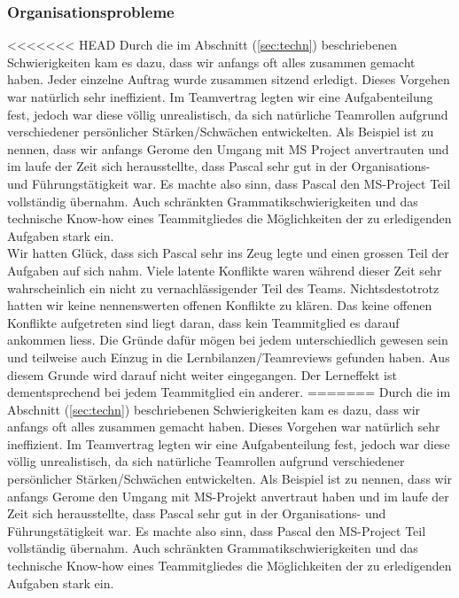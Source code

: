 \subsubsection {Organisationsprobleme} \label{sec:orgprob}
<<<<<<< HEAD
Durch die im Abschnitt (\ref{sec:techn}) beschriebenen Schwierigkeiten kam es dazu, dass wir anfangs oft alles zusammen gemacht haben. Jeder einzelne Auftrag wurde zusammen sitzend erledigt. Dieses Vorgehen war natürlich sehr ineffizient. Im Teamvertrag legten wir eine Aufgabenteilung fest, jedoch war diese völlig unrealistisch, da sich natürliche Teamrollen aufgrund verschiedener persönlicher Stärken/Schwächen entwickelten. Als Beispiel ist zu nennen, dass wir anfangs Gerome den Umgang mit MS Project anvertrauten und im laufe der Zeit sich herausstellte, dass Pascal sehr gut in der Organisations- und Führungstätigkeit war. Es machte also sinn, dass Pascal den MS-Project Teil vollständig übernahm. Auch schränkten Grammatikschwierigkeiten und das technische Know-how eines Teammitgliedes die Möglichkeiten der zu erledigenden Aufgaben stark ein. \\
Wir hatten Glück, dass sich Pascal sehr ins Zeug legte und einen grossen Teil der Aufgaben auf sich nahm. Viele latente Konflikte waren während dieser Zeit sehr wahrscheinlich ein nicht zu vernachlässigender Teil des Teams. Nichtsdestotrotz hatten wir keine nennenswerten offenen Konflikte zu klären. Das keine offenen Konflikte aufgetreten sind liegt daran, dass kein Teammitglied es darauf ankommen liess. Die Gründe dafür mögen bei jedem unterschiedlich gewesen sein und teilweise auch Einzug in die Lernbilanzen/Teamreviews gefunden haben. Aus diesem Grunde wird darauf nicht weiter eingegangen. Der Lerneffekt ist dementsprechend bei jedem Teammitglied ein anderer.
=======
Durch die im Abschnitt (\ref{sec:techn}) beschriebenen Schwierigkeiten kam es dazu, dass wir anfangs oft alles zusammen gemacht haben. Dieses Vorgehen war natürlich sehr ineffizient. Im Teamvertrag legten wir eine Aufgabenteilung fest, jedoch war diese völlig unrealistisch, da sich natürliche Teamrollen aufgrund verschiedener persönlicher Stärken/Schwächen entwickelten. Als Beispiel ist zu nennen, dass wir anfangs Gerome den Umgang mit MS-Projekt anvertraut haben und im laufe der Zeit sich herausstellte, dass Pascal sehr gut in der Organisations- und Führungstätigkeit war. Es machte also sinn, dass Pascal den MS-Project Teil vollständig übernahm. Auch schränkten Grammatikschwierigkeiten und das technische Know-how eines Teammitgliedes die Möglichkeiten der zu erledigenden Aufgaben stark ein. \\
